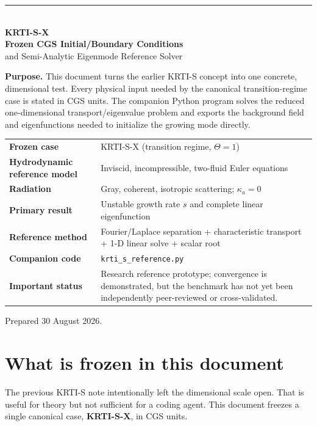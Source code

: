 \documentclass[11pt]{article}
\begin{document}
\begin{titlepage}
\thispagestyle{empty}
\vspace*{0.7cm}
{\color{navy}\rule{\textwidth}{1.6pt}}\\[0.6cm]
{\Huge\bfseries\color{navy} KRTI-S-X}\\[0.2cm]
{\LARGE\bfseries Frozen CGS Initial/Boundary Conditions}\\[0.2cm]
{\Large and Semi-Analytic Eigenmode Reference Solver}\\[0.7cm]

\begin{tcolorbox}[colback=graybox,colframe=darkgray,boxrule=0.8pt,arc=2mm]
\textbf{Purpose.} This document turns the earlier KRTI-S concept into one concrete, dimensional test. Every physical input needed by the canonical transition-regime case is stated in CGS units. The companion Python program solves the reduced one-dimensional transport/eigenvalue problem and exports the background field and eigenfunctions needed to initialize the growing mode directly.
\end{tcolorbox}

\vfill
\begin{tabularx}{\textwidth}{@{}lX@{}}
\textbf{Frozen case} & KRTI-S-X (transition regime, $\Theta=1$) \\
\textbf{Hydrodynamic reference model} & Inviscid, incompressible, two-fluid Euler equations \\
\textbf{Radiation} & Gray, coherent, isotropic scattering; $\kappa_a=0$ \\
\textbf{Primary result} & Unstable growth rate $s$ and complete linear eigenfunction \\
\textbf{Reference method} & Fourier/Laplace separation + characteristic transport + 1-D linear solve + scalar root \\
\textbf{Companion code} & \texttt{krti\_s\_reference.py} \\
\textbf{Important status} & Research reference prototype; convergence is demonstrated, but the benchmark has not yet been independently peer-reviewed or cross-validated. \\
\end{tabularx}
\vfill
{\small Prepared 30 August 2026.}
\end{titlepage}

\tableofcontents
\newpage

\section{What is frozen in this document}
The previous KRTI-S note intentionally left the dimensional scale open. That is useful for theory but not sufficient for a coding agent. This document freezes a single canonical case, \textbf{KRTI-S-X}, in CGS units.
\end{document}
